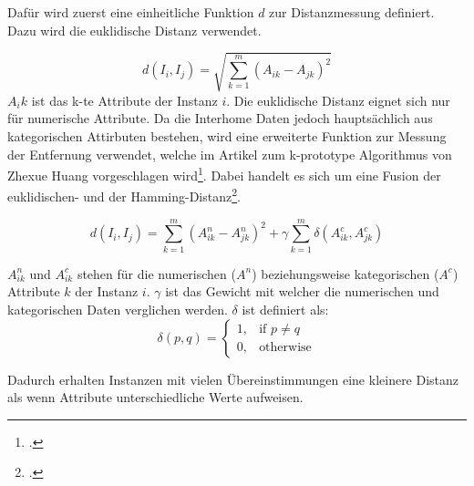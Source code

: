 
Dafür wird zuerst eine einheitliche Funktion $d$ zur Distanzmessung definiert.
Dazu wird die euklidische Distanz verwendet.

$$ d(I_i, I_j) = \sqrt{\sum_{k=1}^{m} (A_{ik} - A_{jk})^2} $$
$A_ik$ ist das k-te Attribute der Instanz $i$. 
Die euklidische Distanz eignet sich nur für numerische Attribute.
Da die Interhome Daten jedoch hauptsächlich aus kategorischen Attirbuten bestehen, wird  eine erweiterte Funktion zur Messung der Entfernung verwendet, welche im Artikel zum k-prototype Algorithmus von Zhexue Huang vorgeschlagen wird\footcite{clustering_numeric_and_categorical_values}.
Dabei handelt es sich um eine Fusion der euklidischen- und der Hamming-Distanz\footcite{data_mining_concepts_and_techniques}.

$$ d(I_i, I_j) = \sum_{k=1}^{m} (A^n_{ik} - A^n_{jk})^2 + \gamma \sum_{k=1}^{m} \delta(A^c_{ik}, A^c_{jk}) $$

$A^n_{ik}$ und $A^c_{ik}$ stehen für die numerischen ($A^n$) beziehungsweise kategorischen ($A^c$) Attribute $k$ der Instanz $i$. 
$\gamma$ ist das Gewicht mit welcher die numerischen und kategorischen Daten verglichen werden.
$\delta$ ist definiert als:
$$ \delta(p,q)= 
\begin{cases}
1,				& \text{if } p \neq q\\
0,              & \text{otherwise}
\end{cases} $$

Dadurch erhalten Instanzen mit vielen Übereinstimmungen eine kleinere Distanz als wenn Attribute unterschiedliche Werte aufweisen.


